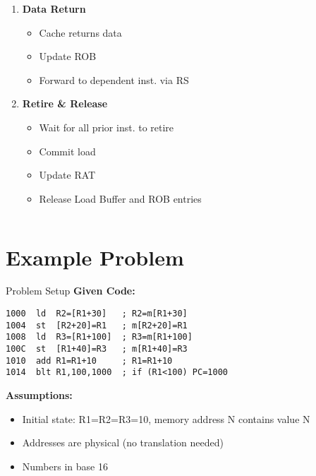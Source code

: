 \documentclass[aspectratio=169,12pt]{beamer}
\begin{document}
\begin{frame}
\begin{columns}[T]
\begin{column}{0.52\textwidth}
\begin{enumerate}
    \item \textbf{Data Return}
    \vspace{-2mm}
    \begin{itemize}
        \item Cache returns data
        \item Update ROB
        \item Forward to dependent inst. via RS
    \end{itemize}

    \item \textbf{Retire \& Release}
    \vspace{-2mm}
    \begin{itemize}
        \item Wait for all prior inst. to retire
        \item Commit load
        \item Update RAT
        \item Release Load Buffer and ROB entries
    \end{itemize}
\end{enumerate}
\end{column}
\end{columns}
\end{frame}

\section{Example Problem}

\begin{frame}[fragile]{Problem Setup}
\textbf{Given Code:}
\begin{lstlisting}[basicstyle=\footnotesize\ttfamily]
1000  ld  R2=[R1+30]   ; R2=m[R1+30]
1004  st  [R2+20]=R1   ; m[R2+20]=R1
1008  ld  R3=[R1+100]  ; R3=m[R1+100]
100C  st  [R1+40]=R3   ; m[R1+40]=R3
1010  add R1=R1+10     ; R1=R1+10
1014  blt R1,100,1000  ; if (R1<100) PC=1000
\end{lstlisting}

\textbf{Assumptions:}
\begin{itemize}
    \item Initial state: R1=R2=R3=10, memory address N contains value N
    \item Addresses are physical (no translation needed)
    \item Numbers in base 16
\end{itemize}
\end{frame}
\end{document}
